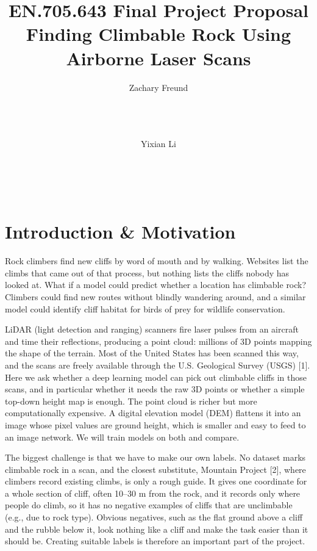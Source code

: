 \documentclass{mva2011}
\begin{document}
\title{EN.705.643 Final Project Proposal \\[0.5em]
      \large Finding Climbable Rock Using Airborne Laser Scans}

\author{
  Zachary Freund\\
  \\
  \\
  \\
  \and
   Yixian Li\\
  \\
  \\
  \\
}
\maketitle

\section{Introduction \& Motivation}

Rock climbers find new cliffs by word of mouth and by walking. Websites list the climbs that came out of that process, but nothing lists the cliffs nobody has looked at. What if a model could predict whether a location has climbable rock? Climbers could find new routes without blindly wandering around, and a similar model could identify cliff habitat for birds of prey for wildlife conservation.

LiDAR (light detection and ranging) scanners fire laser pulses from an aircraft and time their reflections, producing a point cloud: millions of 3D points mapping the shape of the terrain. Most of the United States has been scanned this way, and the scans are freely available through the U.S. Geological Survey (USGS) [1]. Here we ask whether a deep learning model can pick out climbable cliffs in those scans, and in particular whether it needs the raw 3D points or whether a simple top-down height map is enough. The point cloud is richer but more computationally expensive. A digital elevation model (DEM) flattens it into an image whose pixel values are ground height, which is smaller and easy to feed to an image network. We will train models on both and compare.

The biggest challenge is that we have to make our own labels. No dataset marks climbable rock in a scan, and the closest substitute, Mountain Project [2], where climbers record existing climbs, is only a rough guide. It gives one coordinate for a whole section of cliff, often 10–30 m from the rock, and it records only where people do climb, so it has no negative examples of cliffs that are unclimbable (e.g., due to rock type). Obvious negatives, such as the flat ground above a cliff and the rubble below it, look nothing like a cliff and make the task easier than it should be. Creating suitable labels is therefore an important part of the project.
\end{document}
